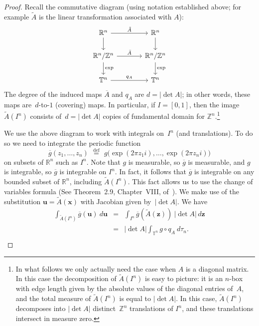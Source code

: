 \documentclass[12pt]{amsart}
\theoremstyle{plain}
\theoremstyle{definition}
\theoremstyle{remark}
\numberwithin{theorem}{section}
\numberwithin{equation}{section} %
\newcommand{\defeq}{\stackrel{\mathrm{def}}{\, = \,}}
\newcommand{\bZ}{{\mathbb{Z}}}
\newcommand{\bR}{{\mathbb{R}}}
\newcommand{\mb}{\mathbf}
\newcommand{\torus}{{\mathbb{T}}}
\begin{document}
\begin{proof}
Recall the commutative diagram (using notation established above; for example $\tilde A$ is the linear transformation associated with $A$):
 $$
 \begin{tikzcd} [column sep = large]
\bR^n  \arrow[r, "\tilde A"]  \arrow[d] & \bR^n \arrow[d]    \\
\bR^n/\bZ^n  \arrow[r, "\bar A"]  \arrow[d, "\mathrm{exp}"] & \bR^n/\bZ^n  \arrow[d, "\mathrm{exp}"]   \\
\torus^n  \arrow[r,  "q_A"]  & \torus^n    
\end{tikzcd}
$$
The degree of 
the induced maps $\overline A$ and $q_A$ are $d = | \det A|$; in other words, these maps are~$d$-to-$1$ (covering) maps.
In particular, if $I = [0, 1]$, then the image $\tilde A (I^n)$ consists of~$d = | \det A|$ copies of fundamental domain for $\bZ^n$.\footnote{In what follows we only actually need the case when $A$ is a diagonal matrix. In this case the decomposition of $\tilde A (I^n)$ is easy to picture: it is  an  $n$-box with edge length given by the absolute values of the diagonal
entries of~$A$, and the total measure of $\tilde A (I^n)$ is equal to $|\det A|$. In this case, $\tilde A (I^n)$ decomposes into $|\det A|$ distinct~$\bZ^n$ translations of $I^n$, and these translations
intersect in measure zero.}

We use the above diagram to work with integrals on~$I^n$ (and translations). To do so we need to integrate
the periodic function
$$
\overline g(z_1, \ldots, z_n) \; \defeq \; g\big( \exp (2 \pi z_1 i), \ldots, \exp (2 \pi z_n i) \big)
$$
on subsets of $\bR^n$ such as $I^n$.
Note that $g$ is measurable, so $\overline g$ is measurable, and $g$ is integrable, so $\overline g$ is integrable on $I^n$. In fact, it follows that $\overline g$ is integrable on
any bounded subset of $\bR^n$, including $\tilde A(I^n)$. This fact allows us to use the change of variables formula (See Theorem~2.9, Chapter~VIII, of~\cite[page 191]{lang_dman}).
We make use of the substitution $\mb u = \tilde A (\mb x)$ with Jacobian given by~$|\det A|$. 
We have
\begin{eqnarray*}
\int_{\tilde A (I^n)} \overline g\left ( \mb u\right)\ d \mb u
&=&
\int_{I^n} \overline g\left (\tilde A (\mb z)\right)\ |\det A|  \, d \mb z \\
&=&
|\det A| \int_{\torus^n} g \circ q_A \ d\tau_n. \\
\end{eqnarray*}


\end{proof}
\end{document}
